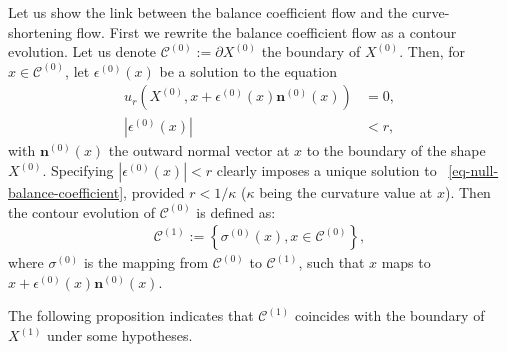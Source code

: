 \documentclass[review]{siamart220329}
\newcommand{\C}{\mathcal{C}} %
\begin{document}
Let us show the link between the balance coefficient flow and the
curve-shortening flow. First we rewrite the balance coefficient flow
as a contour evolution. Let us denote $\C^{(0)} := \partial
X^{(0)}$ the boundary of $X^{(0)}$. Then, for $x \in \C^{(0)}$,
let $\epsilon^{(0)}(x)$ be a solution to the equation
\begin{align} \label{eq-null-balance-coefficient}
  u_r(X^{(0)}, x +\epsilon^{(0)}(x)
  \mathbf{n}^{(0)}(x)) & = 0, \\
  |\epsilon^{(0)}(x)| & < r, \nonumber
\end{align}
with $\mathbf{n}^{(0)}(x)$ the outward normal vector at $x$ to
the boundary of the shape $X^{(0)}$. Specifying
$|\epsilon^{(0)}(x)| < r$ clearly imposes a unique solution to
~\cref{eq-null-balance-coefficient}, provided $r < 1/\kappa$ ($\kappa$ being the 
curvature value at $x$). Then the
contour evolution of $\C^{(0)}$ is defined as:
\begin{align} \label{eq-balance-coefficient-contour-flow}
  \C^{(1)} := \left\{ \sigma^{(0)}(x), x \in \C^{(0)} \right\},
\end{align}
where $\sigma^{(0)}$ is the mapping from $\C^{(0)}$ to $\C^{(1)}$, such that $x$ maps to $x+\epsilon^{(0)}(x) \mathbf{n}^{(0)}(x)$.

The following proposition indicates that $\C^{(1)}$ coincides with
the boundary of $X^{(1)}$ under some hypotheses.
\end{document}
